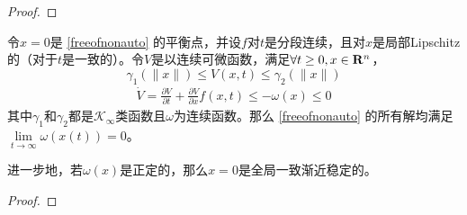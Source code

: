 \begin{proof}
    
\end{proof}
\begin{theorem}\label{LaSalle-Yoshizawa}
    令$x=0$是 \eqref{freeofnonauto} 的平衡点，并设$f$对$t$是分段连续，且对$x$是局部Lipschitz的（对于$t$是一致的）。令$V$是以连续可微函数，满足$\forall t\ge 0,x\in\mathbf{R}{}^n$，\[\gamma_1(\|x\|)\le V(x,t)\le \gamma_2(\|x\|)\]
    \[\begin{aligned}\dot{V}=\frac{\partial V}{\partial t}+\frac{\partial V}{\partial x}f(x,t)\leq-\omega(x)\leq0\end{aligned}\]
    其中$\gamma_1$和$\gamma_2$都是$\mathcal{K}_\infty$类函数且$\omega$为连续函数。那么  \eqref{freeofnonauto} 的所有解均满足$\lim\limits_{t\to\infty}\omega(x(t))=0$。
    
    进一步地，若$\omega(x)$是正定的，那么$x=0$是全局一致渐近稳定的。
\end{theorem}
\begin{proof}
    
\end{proof}